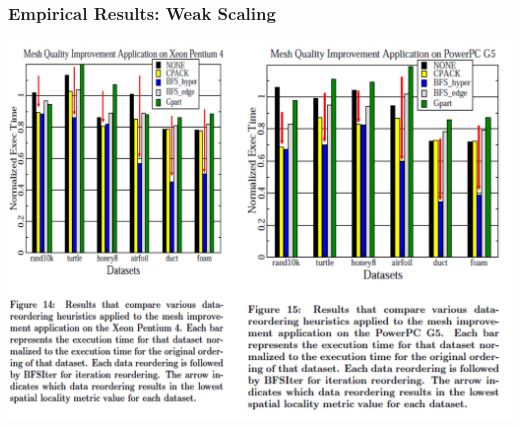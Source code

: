 \documentclass{beamer}
\begin{document}
\begin{frame}[fragile,t]
  \frametitle{Empirical Results: Weak Scaling}

\includegraphics[width=59ex]{ParTeaserFigs/DataReordRes}

\end{frame}
\end{document}
